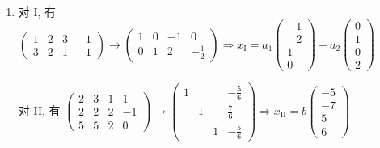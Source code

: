      \paragraph{} %
         \begin{enumerate}
             \item %
                   对 I, 有 \( \begin{pmatrix}
                       1 & 2 & 3 & -1 \\
                       3 & 2 & 1 & -1
                   \end{pmatrix} \rightarrow \begin{pmatrix}
                       1 & 0 & -1 & 0            \\
                       0 & 1 & 2  & -\frac{1}{2}
                   \end{pmatrix} \Rightarrow x_{\text{I}} = a_{1}\begin{pmatrix}
                       -1 \\
                       -2 \\
                       1  \\
                       0
                   \end{pmatrix} + a_{2}\begin{pmatrix}
                       0 \\
                       1 \\
                       0 \\
                       2
                   \end{pmatrix} \)

                   对 II, 有 \( \begin{pmatrix}
                       2 & 3 & 1 & 1  \\
                       2 & 2 & 2 & -1 \\
                       5 & 5 & 2 & 0
                   \end{pmatrix} \rightarrow \begin{pmatrix}
                       1 &   &   & -\frac{5}{6} \\
                         & 1 &   & \frac{7}{6}  \\
                         &   & 1 & -\frac{5}{6}
                   \end{pmatrix} \Rightarrow x_{\text{II}} = b\begin{pmatrix}
                       -5 \\
                       -7 \\
                       5  \\
                       6
                   \end{pmatrix} \)


\end{enumerate}

